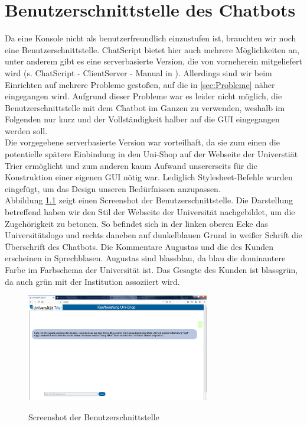 \chapter{Benutzerschnittstelle des Chatbots}
\label{sec:Benutzerschnittstelle}

Da eine Konsole nicht als benutzerfreundlich einzustufen ist, brauchten wir noch eine Benutzerschnittstelle. ChatScript bietet hier auch mehrere Möglichkeiten an, unter anderem gibt es eine serverbasierte Version, die von vorneherein mitgeliefert wird (s. ChatScript - ClientServer - Manual in \citet{chatscript2019}). Allerdings sind wir beim Einrichten auf mehrere Probleme gestoßen, auf die in \ref{sec:Probleme} näher eingegangen wird. Aufgrund dieser Probleme war es leider nicht möglich, die Benutzerschnittstelle mit dem Chatbot im Ganzen zu verwenden, weshalb im Folgenden nur kurz und der Vollständigkeit halber auf die GUI eingegangen werden soll.\\
Die vorgegebene serverbasierte Version war vorteilhaft, da sie zum einen die potentielle spätere Einbindung in den Uni-Shop auf der Webseite der Universtiät Trier ermöglicht und zum anderen kaum Aufwand unsererseits für die Konstruktion einer eigenen GUI nötig war. Lediglich Stylesheet-Befehle wurden eingefügt, um das Design unseren Bedürfnissen anzupassen.\\
Abbildung \ref{ScreenshotGUI} zeigt einen Screenshot der Benutzerschnittstelle. Die Darstellung betreffend haben wir den Stil der Webseite der Universität nachgebildet, um die Zugehörigkeit zu betonen. So befindet sich in der linken oberen Ecke das Universitätslogo und rechts daneben auf dunkelblauen Grund in weißer Schrift die Überschrift des Chatbots. Die Kommentare Augustas und die des Kunden erscheinen in Sprechblasen. Augustas sind blassblau, da blau die dominantere Farbe im Farbschema der Universität ist. Das Gesagte des Kunden ist blassgrün, da auch grün mit der Institution assoziiert wird.\\


\begin{figure}
\begin{center}
{\includegraphics[width=8cm]{BILDER/gui.png}}
\end{center}
	\caption{Screenshot der Benutzerschnittstelle}
	\label{ScreenshotGUI}
\end{figure}
